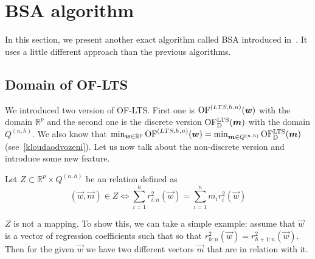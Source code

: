 







\section{BSA algorithm} \label{bsasection}
In this section, we present another exact algorithm called BSA introduced in~\cite{klouda2015exact}. It uses a little different approach than the previous algorithms.



\subsection{Domain of OF-LTS}
We introduced two version of OF-LTS. First one is 
$\operatorname{OF}^{(LTS,h, n)}(\boldsymbol{w})$ with the domain $\mathbb{R}^p$ and the second one is the discrete version 
$\operatorname{OF^{LTS}_D}(\boldsymbol{m})$ with the domain $Q^{(n,h)}$. 
We also know that 
$\operatorname*{min}_{\boldsymbol{w} \in \mathbb{R}^p} \operatorname{OF}^{(LTS,h, n)}(\boldsymbol{w})  =  \operatorname*{min}_{\boldsymbol{m} \in Q^{(n,h)}} \operatorname{OF^{LTS}_D}(\boldsymbol{m})$ (see~\eqref{kloudaodvozeni}). Let us now talk about the non-discrete version and introduce some new feature.

\begin{definition}
    Let $Z \subset \mathbb{R}^p \times  Q^{(n,h)}$ be an relation defined as
    \begin{equation}
        (\vec{w}, \vec{m}) \in Z \Leftrightarrow \sum\limits_{i=1}^h r_{i:n}^2(\vec{w}) = \sum\limits_{i=1}^n m_i r_{i}^2(\vec{w})
    \end{equation}
\end{definition}


$Z$ is not a mapping. To show this, we can take a simple example: assume that $\vec{w}$ is a vector of regression coefficients such that so that $r^{2}_{h:n}(\vec{w}) = r^{2}_{h+1:n}(\vec{w})$. Then for the given $\vec{w}$ we have two different vectors $\vec{m}$ that are in relation with it.

